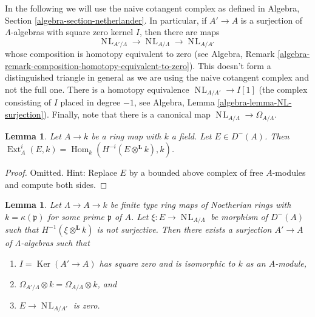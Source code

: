 \documentclass{stacks-project}
\theoremstyle{plain}
\newtheorem{lemma}[subsection]{Lemma}
\theoremstyle{definition}
\theoremstyle{remark}
\numberwithin{equation}{subsection}
\def\Hom{\mathop{\mathrm{Hom}}\nolimits}
\def\Ext{\mathop{\mathrm{Ext}}\nolimits}
\def\NL{\mathop{N\!L}\nolimits}
\def\Ker{\mathop{\mathrm{Ker}}}
\begin{document}
\medskip\noindent
In the following we will use the naive cotangent complex as
defined in Algebra, Section \ref{algebra-section-netherlander}.
In particular, if $A' \to A$ is a surjection of $\Lambda$-algebras
with square zero kernel $I$, then there are maps
$$
\NL_{A'/\Lambda} \to \NL_{A/\Lambda} \to \NL_{A/A'}
$$
whose composition is homotopy equivalent to zero (see
Algebra, Remark \ref{algebra-remark-composition-homotopy-equivalent-to-zero}).
This doesn't form a distinguished triangle in general as we are using
the naive cotangent complex and not the full one.
There is a homotopy equivalence $\NL_{A/A'} \to I[1]$ (the complex
consisting of $I$ placed in degree $-1$, see
Algebra, Lemma \ref{algebra-lemma-NL-surjection}).
Finally, note that there is a canonical map
$\NL_{A/\Lambda} \to \Omega_{A/\Lambda}$.

\begin{lemma}
\label{lemma-compute-ext-into-field}
Let $A \to k$ be a ring map with $k$ a field. Let $E \in D^-(A)$.
Then $\Ext^i_A(E, k) = \Hom_k(H^{-i}(E \otimes^\mathbf{L} k), k)$.
\end{lemma}

\begin{proof}
Omitted. Hint: Replace $E$ by a bounded above complex of free $A$-modules
and compute both sides.
\end{proof}

\begin{lemma}
\label{lemma-construct-essential-surjection}
Let $\Lambda \to A \to k$ be finite type ring maps of Noetherian rings with
$k = \kappa(\mathfrak p)$ for some prime $\mathfrak p$ of $A$. Let
$\xi : E \to \NL_{A/\Lambda}$ be morphism of $D^{-}(A)$ such that
$H^{-1}(\xi \otimes^{\mathbf{L}} k)$ is not surjective.
Then there exists a surjection $A' \to A$ of $\Lambda$-algebras
such that
\begin{enumerate}
\item[(a)] $I = \Ker(A' \to A)$ has square zero and is isomorphic to $k$
as an $A$-module,
\item[(b)] $\Omega_{A'/\Lambda} \otimes k = \Omega_{A/\Lambda} \otimes k$, and
\item[(c)] $E \to \NL_{A/A'}$ is zero.
\end{enumerate}
\end{lemma}
\end{document}
